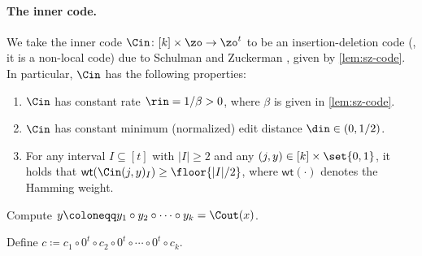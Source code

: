 \paragraph{The inner code.} We take the inner code $\Cin \colon [k] \times \zo \rightarrow \zo^t$ to be an insertion-deletion code (\ie, it is a non-local code) due to Schulman and Zuckerman \cite{SchZuc99}, given by \cref{lem:sz-code}.
In particular, $\Cin$ has the following properties:
\begin{enumerate}
	\item $\Cin$ has constant rate $\rin = 1/\beta > 0$, where $\beta$ is given in \cref{lem:sz-code}. %
	
	\item $\Cin$ has constant minimum (normalized) edit distance $\din \in (0,1/2)$. %
	
	\item For any interval $I \subseteq [t]$ with $|I|\ge 2$ and any $(j,y) \in [k]\times\set{0,1}$, it holds that $\textsf{wt}(\Cin(j,y)_{I}) \ge \floor{|I|/2}$, where $\textsf{wt}(\cdot)$ denotes the Hamming weight.
\end{enumerate}

	\begin{algorithm}[tp]
		\caption{Encoding algorithm $C$.}\label{alg:encoder}
		
		Compute $y \coloneqq y_1 \circ y_2 \circ \cdots \circ y_k = \Cout(x)$.
		
	
		Define $c \coloneqq c_1 \circ 0^t \circ c_2 \circ 0^t \circ \cdots \circ 0^t \circ c_k$. \label{line:final-codeword}
		
	\end{algorithm}


